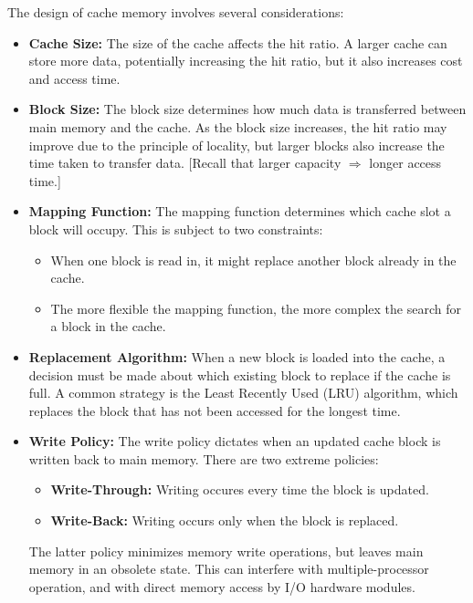 \documentclass{article}
\begin{document}
\newpage

The design of cache memory involves several considerations:
\begin{itemize}
    \item \textbf{Cache Size:} The size of the cache affects the hit ratio. 
    A larger cache can store more data, potentially increasing the hit ratio, but it also increases cost and access time.
    \item \textbf{Block Size:} The block size determines how much data is transferred between main memory and the cache.
    As the block size increases, the hit ratio may improve due to the principle of locality, but larger blocks also increase the time taken to transfer data.
    [Recall that larger capacity $\Rightarrow$ longer access time.]
    \item \textbf{Mapping Function:} The mapping function determines which cache slot a block will occupy.
    This is subject to two constraints:
    \begin{itemize}
        \item When one block is read in, it might replace another block already in the cache.
        \item The more flexible the mapping function, the more complex the search for a block in the cache.
    \end{itemize}
    \item \textbf{Replacement Algorithm:} When a new block is loaded into the cache, a decision must be made about which existing block to replace if the cache is full.
    A common strategy is the Least Recently Used (LRU) algorithm, which replaces the block that has not been accessed for the longest time.
    \item \textbf{Write Policy:} The write policy dictates when an updated cache block is written back to main memory.
    There are two extreme policies:
    \begin{itemize}
        \item \textbf{Write-Through:} Writing occures every time the block is updated.
        \item \textbf{Write-Back:} Writing occurs only when the block is replaced.
    \end{itemize}
     The latter policy minimizes memory write operations, but leaves main 
memory in an obsolete state. This can interfere with multiple-processor operation, 
and with direct memory access by I/O hardware modules.
\end{itemize}
\end{document}
